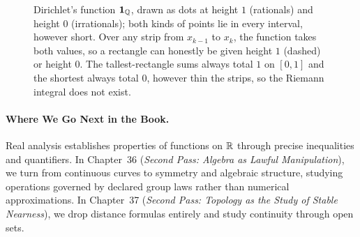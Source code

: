 \begin{figure}[htbp]
\centering
{}
\caption{Dirichlet's function $\mathbf{1}_{\mathbb{Q}}$, drawn as dots at height $1$ (rationals) and height $0$ (irrationals); both kinds of points lie in every interval, however short. Over any strip from $x_{k-1}$ to $x_k$, the function takes both values, so a rectangle can honestly be given height $1$ (dashed) or height $0$. The tallest-rectangle sums always total $1$ on $[0, 1]$ and the shortest always total $0$, however thin the strips, so the Riemann integral does not exist.}
\label{35:fig-dirichlet}
\end{figure}

\paragraph{Where We Go Next in the Book.}
Real analysis establishes properties of functions on $\mathbb{R}$ through precise inequalities and quantifiers. In Chapter~36 (\emph{Second Pass: Algebra as Lawful Manipulation}), we turn from continuous curves to symmetry and algebraic structure, studying operations governed by declared group laws rather than numerical approximations. In Chapter~37 (\emph{Second Pass: Topology as the Study of Stable Nearness}), we drop distance formulas entirely and study continuity through open sets.

